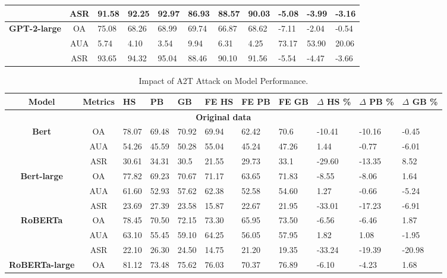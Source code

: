 \documentclass{article}
\begin{document}
\begin{table}[ht]
\begin{tabular}{c|c|p{0.6cm}p{0.6cm}p{0.6cm}|p{1cm}p{1cm}p{1cm}|p{1cm}p{1cm}p{1cm}}
& ASR  & 91.58  & 92.25 & 92.97 & 86.93 & 88.57 & 90.03 & -5.08 & -3.99 & -3.16 \\ \hline
\multirow{3}{*}{\textbf{GPT-2-large}}        & OA   & 75.08  & 68.26 & 68.99 & 69.74 & 66.87 & 68.62 & -7.11 & -2.04 & -0.54 \\ 
& AUA  & 5.74   & 4.10  & 3.54  & 9.94  & 6.31  & 4.25  & 73.17 & 53.90 & 20.06 \\ 
& ASR  & 93.65  & 94.32 & 95.04 & 88.46 & 90.10 & 91.56 & -5.54 & -4.47 & -3.66 \\ \hline
\end{tabular}
\label{table:adversarial_combined_impact_textfooller}
\end{table}



\begin{table}[ht]
\caption{Impact of A2T Attack on Model Performance.}
\scriptsize
\centering
\begin{tabular}{c|c|p{0.6cm}p{0.6cm}p{0.6cm}|p{1cm}p{1cm}p{1cm}|p{1cm}p{1cm}p{1cm}}
\hline
\textbf{Model} & \textbf{Metrics} & {HS} & {PB} & {GB} & {FE HS} & {FE PB} & {FE GB} & $\Delta$ HS \% & $\Delta$ PB \% & $\Delta$ GB \% \\ \hline
\multicolumn{11}{c}{\textbf{Original data}} \\ \hline
\multirow{3}{*}{\textbf{Bert}} & OA   & 78.07 & 69.48 & 70.92 & 69.94 & 62.42 & 70.6  & -10.41 & -10.16 & -0.45 \\ 
& AUA  & 54.26 & 45.59 & 50.28 & 55.04 & 45.24 & 47.26 & 1.44 & -0.77 & -6.01 \\ 
& ASR  & 30.61 & 34.31 & 30.5  & 21.55 & 29.73 & 33.1  & -29.60 & -13.35 & 8.52 \\ \hline
\multirow{3}{*}{\textbf{Bert-large}} & OA   & 77.82  & 69.23 & 70.67 & 71.17 & 63.65 & 71.83 & -8.55 & -8.06 & 1.64 \\ 
& AUA  & 61.60  & 52.93  & 57.62  & 62.38  & 52.58  & 54.60  & 1.27 & -0.66 & -5.24 \\ 
& ASR  & 23.69 & 27.39 & 23.58 & 15.87  & 22.67 & 21.95 & -33.01 & -17.23  & -6.91 \\ \hline
\multirow{3}{*}{\textbf{RoBERTa}} & OA & 78.45 & 70.50 & 72.15 & 73.30 & 65.95 & 73.50 & -6.56 & -6.46 & 1.87 \\ 
& AUA & 63.10 & 55.45 & 59.10 & 64.25 & 56.05 & 57.95 & 1.82 & 1.08 & -1.95 \\ 
& ASR & 22.10 & 26.30 & 24.50 & 14.75 & 21.20 & 19.35 & -33.24 & -19.39 & -20.98 \\ \hline
\multirow{3}{*}{\textbf{RoBERTa-large}} & OA & 81.12 & 73.48 & 75.62 & 76.03 & 70.37 & 76.89 & -6.10 & -4.23 & 1.68 \\ 

\end{tabular}
\end{table}
\end{document}
